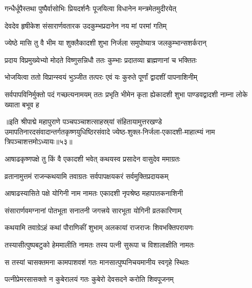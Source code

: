 \twolineshloka
{गन्धैर्धूपैस्तथा पुष्पैर्वासोभिः प्रियदर्शनैः}
{पूजयित्वा विधानेन मन्त्रमेतमुदीरयेत्}%

\twolineshloka
{देवदेव हृषीकेश संसारार्णवतारक}
{उदकुम्भप्रदानेन नय मां परमां गतिम्}%

\twolineshloka
{ज्येष्ठे मासि तु वै भीम या शुक्लैकादशी शुभा}
{निर्जला समुपोष्यात्र जलकुम्भान्सशर्करान्}%

\twolineshloka
{प्रदाय विप्रमुख्येभ्यो मोदते विष्णुसन्निधौ}
{ततः कुम्भाः प्रदातव्या ब्राह्मणानां  च भक्तितः}%

\twolineshloka
{भोजयित्वा ततो विप्रान्स्वयं भुञ्जीत तत्परः}
{एवं यः कुरुते पूर्णां द्वादशीं पापनाशिनीम्}%

\threelineshloka
{सर्वपापविनिर्मुक्तो पदं गच्छत्यनामयम्}
{ततः प्रभृति भीमेन कृता ह्येकादशी शुभा}
{पाण्डवद्वादशी नाम्ना लोके ख्याता बभूव ह}%

॥इति श्रीपाद्मे महापुराणे पञ्चपञ्चाशत्साहस्र्यां संहितायामुत्तरखण्डे उमापतिनारदसंवादान्तर्गतकृष्णयुधिष्ठिरसंवादे ज्येष्ठ-शुक्ल-निर्जला-एकादशी-माहात्म्यं नाम त्रिपञ्चाशत्तमोऽध्यायः॥५३॥


\hyperref[sec:ekadashi_mahatmyam_padma_puranam]{\closesub}
\clearpage

\label{sec:padma-ashadha-krishna-yogini}



\twolineshloka
{आषाढकृष्णपक्षे तु किं वै एकादशी भवेत्}
{कथयस्व प्रसादेन वासुदेव ममाग्रतः}%


\twolineshloka
{व्रतानामुत्तमं राजन्कथयामि तवाग्रतः}
{सर्वपापक्षयकरं सर्वमुक्तिप्रदायकम्}%

\twolineshloka
{आषाढस्यासिते पक्षे योगिनी नाम नामतः}
{एकादशी नृपश्रेष्ठ महापातकनाशिनी}%

\twolineshloka
{संसारार्णवमग्नानां पोतभूता सनातनी}
{जगत्त्रये सारभूता योगिनी व्रतकारिणाम्}%

\twolineshloka
{कथयामि तवाग्रेऽहं कथां पौराणिकीं शुभाम्}
{अलकायां राजराजः शिवभक्तिपरायणः}%

\twolineshloka
{तस्यासीत्पुष्पबटुको हेममालीति नामतः}
{तस्य पत्नी सुरूपा च विशालाक्षीति नामतः}%

\twolineshloka
{स तस्यां चासक्तमना कामपाशवशं गतः}
{मानसात्पुष्पनिचयमानीय स्वगृहे स्थितः}%

\twolineshloka
{पत्नीप्रेमरसासक्तो न कुबेरालयं गतः}
{कुबेरो देवसदने करोति शिवपूजनम्}%

